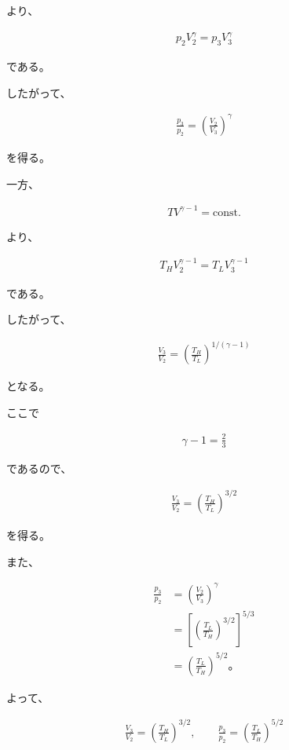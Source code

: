 \documentclass[platex,dvipdfmx,a4paper]{jsarticle}
\begin{document}
より、

\begin{align*}
p_2V_2^\gamma
=
p_3V_3^\gamma
\end{align*}

である。

したがって、

\begin{align*}
\frac{p_3}{p_2}
=
\left(
\frac{V_2}{V_3}
\right)^\gamma
\end{align*}

を得る。

一方、

\begin{align*}
TV^{\gamma-1}
=
\mathrm{const.}
\end{align*}

より、

\begin{align*}
T_HV_2^{\gamma-1}
=
T_LV_3^{\gamma-1}
\end{align*}

である。

したがって、

\begin{align*}
\frac{V_3}{V_2}
=
\left(
\frac{T_H}{T_L}
\right)^{1/(\gamma-1)}
\end{align*}

となる。

ここで

\begin{align*}
\gamma-1=\frac23
\end{align*}

であるので、

\begin{align*}
\frac{V_3}{V_2}
=
\left(
\frac{T_H}{T_L}
\right)^{3/2}
\end{align*}

を得る。

また、

\begin{align*}
\frac{p_3}{p_2}
&=
\left(
\frac{V_2}{V_3}
\right)^\gamma \\
&=
\left[
\left(
\frac{T_L}{T_H}
\right)^{3/2}
\right]^{5/3} \\
&=
\left(
\frac{T_L}{T_H}
\right)^{5/2}。
\end{align*}

よって、

\begin{align*}
\frac{V_3}{V_2}
=
\left(
\frac{T_H}{T_L}
\right)^{3/2},
\qquad
\frac{p_3}{p_2}
=
\left(
\frac{T_L}{T_H}
\right)^{5/2}
\end{align*}
\end{document}
